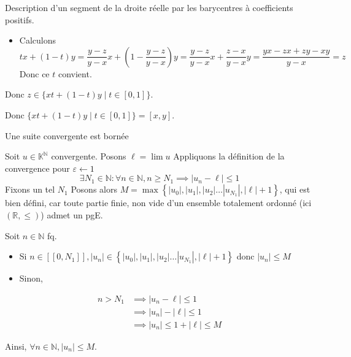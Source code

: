 \documentclass{article}
\renewenvironment{question_kholle}[2][ ]
{
	\subsection{\texorpdfstring{#2}{}}
	\notblank{#1}
	{
		\noindent #1
		\bigbreak
	}
	{}
	\begin{proof}
}
{
	\end{proof}
}
\begin{document}
\begin{question_kholle}[{
  Soient $(x, y) \in \R^2$ tels que $x \leqslant y$. $$[x, y] = \{z \in \R \mid x \leqslant z \leqslant y \} = \{tx + (1-t)y \mid t \in [0, 1]\}$$
  }]{Description d'un segment de la droite réelle par les barycentres à coefficients positifs.}
\begin{itemize}[label=$\star$]
\begin{itemize}[label=$\bullet$]
$$
      x\leqslant z \leqslant y
      \implies x-y \leqslant z-y \leqslant 0 \implies y-x\geqslant y-z \geqslant 0 \implies 1 \geqslant \frac{y-z}{y-x} \geqslant 0 \implies 0\leqslant t \leqslant 1
$$
      \item Calculons
$$
      tx+(1-t)y = \frac{y-z}{y-x} x + \left( 1- \frac{y-z}{y-x} \right)y = \frac{y-z}{y-x}x + \frac{z-x}{y-x}y = \frac{yx-zx+zy - xy}{y-x} =  z
$$
      Donc ce $t$ convient.
    \end{itemize}
    Donc $z \in \{ xt+(1-t)y \mid t \in [0, 1] \}$.
  \end{itemize}
  Donc $\{ xt+(1-t)y \mid t \in [0, 1] \} = [x, y]$.
\end{question_kholle}
\begin{question_kholle}{Une suite convergente est bornée}
  
  Soit $u \in \mathbb{K}^{\mathbb{N}}$ convergente.
  Posons $\ell = \lim u$
  Appliquons la définition de la convergence pour $\varepsilon \leftarrow 1$
  $$
  \exists N_{1}\in \mathbb{N}: \forall n \in \mathbb{N}, n \geqslant N_{1} \implies |u_{n}-\ell| \leqslant 1
  $$
  Fixons un tel $N_{1}$
  Posons alors $M = \max\left\{ |u_{0}|, |u_{1}|, |u_{2}| \dots |u_{N_{1}}|, |\ell|+1 \right\}$, qui est bien défini, car toute partie finie, non vide d'un ensemble totalement ordonné (ici $(\mathbb{R}, \leqslant)$) admet un pgE.
  
  Soit $n \in \mathbb{N}$ fq.
  \begin{itemize}
    \item Si $n \in [[0, N_{1}]], |u_{n}| \in \left\{ |u_{0}|, |u_{1}|, |u_{2}| \dots |u_{N_{1}}|, |\ell|+1 \right\}$ donc $|u_{n}| \leqslant M$
    \item Sinon,
  \end{itemize}
  
  \begin{align*}
    n> N_{1} & \implies |u_{n} - \ell| \leqslant 1              \\
    & \implies |u_{n}| - |\ell| \leqslant 1            \\
    & \implies |u_{n}| \leqslant 1+ |\ell| \leqslant M
  \end{align*}
  
  Ainsi, $\forall n \in \mathbb{N}, |u_{n}| \leqslant M$.
\end{question_kholle}
\end{document}
